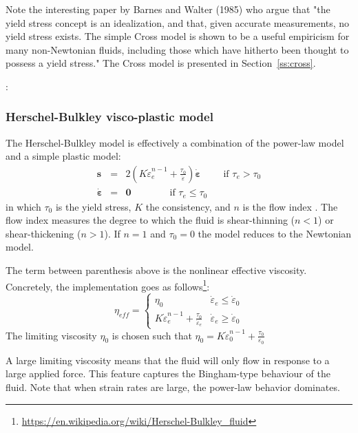 Note the interesting paper by Barnes and Walter (1985) \cite{bawa85} who argue that 
"the yield stress concept is an idealization, and that, given accurate
measurements, no yield stress exists. The simple Cross model is shown to be a
useful empiricism for many non-Newtonian fluids, including those which have
hitherto been thought to possess a yield stress." The Cross model is presented 
in Section~\ref{ss:cross}.
 

\Literature: \cite{papa87,blmi97,mizi01,limd02,maky17,syga14,bingham,baru09,been80,svna18}

\subsubsection{Herschel-Bulkley visco-plastic model}

The Herschel-Bulkley model is effectively a combination of the power-law model and 
a simple plastic model:
\begin{eqnarray}
{\bm s} &=& 2 \left(  K \dot{\varepsilon}_e^{n-1} + \frac{\tau_0}{\dot{\varepsilon}}\right)\dot{\bm \varepsilon} \qquad \text{ if } {\tau}_{e}>\tau_0 \\
\dot{\bm \varepsilon} &=& {\bm 0} \qquad\qquad \text{if }{\tau}_{e} \leq \tau_0 
\end{eqnarray}
in which $\tau_0$ is the yield stress, $K$ the consistency, and $n$ is the flow index  \cite{demj04}.
The flow index measures the degree to which the fluid is shear-thinning ($n<1$) or shear-thickening ($n>1$).
If $n=1$ and $\tau_0=0$ the model reduces to the Newtonian model. 

The term between parenthesis above is the nonlinear effective viscosity. Concretely, the implementation goes as 
follows\footnote{\url{https://en.wikipedia.org/wiki/Herschel-Bulkley_fluid}}:
\[
\eta_{eff} = 
\left\{
\begin{array}{cc}
\eta_0 & \dot{\varepsilon}_e\leq \dot{\varepsilon}_0 \\ 
K \dot{\varepsilon}_e^{n-1} + \frac{\tau_0}{\dot{\varepsilon}_e} & \dot{\varepsilon}_e \geq \dot{\varepsilon}_0
\end{array}
\right.
\]
The limiting viscosity $\eta_0$ is chosen such that 
$\eta_0 =  K \dot{\varepsilon}_0^{n-1} + \frac{\tau_0}{\dot{\varepsilon}_0}$

A large limiting viscosity means that the fluid will only flow in response to a large applied force. 
This feature captures the Bingham-type behaviour of the fluid. 
Note that when strain rates are large, the power-law behavior dominates. 

